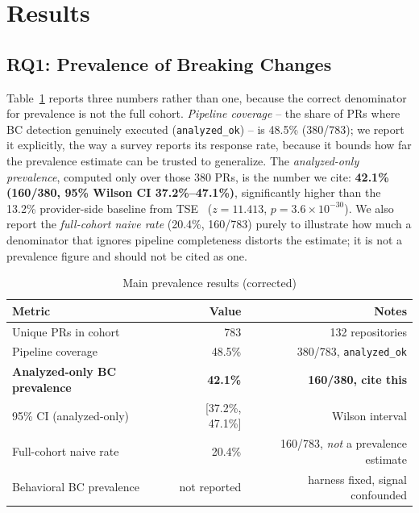 \documentclass[10pt,journal]{IEEEtran}
\begin{document}
\section{Results}
\subsection{RQ1: Prevalence of Breaking Changes}
Table~\ref{tab:rq1-main} reports three numbers rather than one, because the correct denominator for prevalence is not the full cohort. \emph{Pipeline coverage} -- the share of PRs where BC detection genuinely executed (\texttt{analyzed\_ok}) -- is 48.5\% (380/783); we report it explicitly, the way a survey reports its response rate, because it bounds how far the prevalence estimate can be trusted to generalize. The \emph{analyzed-only prevalence}, computed only over those 380 PRs, is the number we cite: \textbf{42.1\% (160/380, 95\% Wilson CI 37.2\%--47.1\%)}, significantly higher than the 13.2\% provider-side baseline from TSE~\cite{raemaekers2021} ($z=11.413$, $p=3.6\times10^{-30}$). We also report the \emph{full-cohort naive rate} (20.4\%, 160/783) purely to illustrate how much a denominator that ignores pipeline completeness distorts the estimate; it is not a prevalence figure and should not be cited as one.

\begin{table}[t]
\caption{Main prevalence results (corrected)}
\label{tab:rq1-main}
\centering
\begin{tabular}{lrr}
\toprule
Metric & Value & Notes \\
\midrule
Unique PRs in cohort & 783 & 132 repositories \\
Pipeline coverage & 48.5\% & 380/783, \texttt{analyzed\_ok} \\
\textbf{Analyzed-only BC prevalence} & \textbf{42.1\%} & \textbf{160/380, cite this} \\
95\% CI (analyzed-only) & [37.2\%, 47.1\%] & Wilson interval \\
Full-cohort naive rate & 20.4\% & 160/783, \emph{not} a prevalence estimate \\
Behavioral BC prevalence & not reported & harness fixed, signal confounded \\
\bottomrule
\end{tabular}
\end{table}
\end{document}
